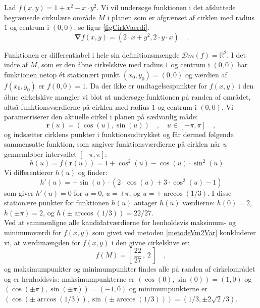 \begin{example}\label{exampUndersog2Var}
Lad $f(x,y) = 1 + x^{2} - x\cdot y^{2}$. Vi vil  undersøge funktionen i det afsluttede begrænsede cirkulære område $M$ i planen som er afgrænset af cirklen med radius $1$ og centrum i $(0, 0)$, se figur \ref{figCirkVaerdi}.
\begin{equation}
\bm{\nabla}f(x, y) = (2\cdot x + y^{2}, 2\cdot y \cdot x) \quad .
\end{equation}

Funktionen er differentiabel i hele sin definitionsmængde $\mathcal{D}m(f) = \mathbb{R}^{2}$. I det indre af $M$, som er den åbne cirkelskive med radius $1$ og centrum i $(0,0)$ har funktionen netop \'{e}t stationært punkt $(x_{0}, y_{0}) = (0, 0)$ og værdien af $f(x_{0}, y_{0})$ er $f(0,0) = 1$. Da der ikke er undtagelsespunkter for $f(x,y)$ i den åbne cirkelskive mangler vi blot at undersøge funktionen på randen af området, altså funktionsværdierne på cirklen med radius $1$ og centrum i $(0,0)$.
Vi parametriserer den aktuelle  cirkel i planen på sædvanlig måde:
\begin{equation}
\mathbf{r}(u) = (\cos(u), \sin(u)) \quad, \quad u \in [-\pi, \pi] \quad ,
\end{equation}
og indsætter cirklens punkter i funktionsudtrykket og får dermed følgende sammensatte funktion, som angiver funktionsværdierne på cirklen når $u$ gennemløber intervallet $[-\pi, \pi]$:
\begin{equation}
h(u) = f(\mathbf{r}(u)) = 1+ \cos^{2}(u) - \cos(u)\cdot\sin^{2}(u) \quad .
\end{equation}
Vi differentierer $h(u)$ og finder:
\begin{equation}
h'(u) = -\sin(u)\cdot(2\cdot \cos(u) + 3\cdot \cos^{2}(u) -1)
\end{equation}
som giver $h'(u) = 0$ for $u= 0$, $u= \pm\pi$, og $u= \pm\arccos(1/3)$. I disse stationære punkter for funktionen
$h(u)$ antager $h(u)$ værdierne: $h(0) = 2$, $h(\pm \pi) = 2$, og $h(\pm\arccos(1/3)) = 22/27$. \\

Ved at sammenligne alle kandidatværdierne for henholdsvis  maksimum- og minimumværdi for $f(x,y)$ som givet ved metoden \ref{metodeVm2Var} konkluderer vi, at værdimængden for $f(x,y)$ i den givne cirkelskive er:
\begin{equation}
f(M) = \left[\, \frac{22}{27}\, , \,  2\, \right] \quad,
\end{equation}
og maksimumpunkter og minimumpunkter findes alle på randen af cirkelområdet og er henholdsvis: maksimumpunkterne er  $(\cos(0), \sin(0)) = (1,0)$ og $(\cos(\pm\pi), \sin(\pm\pi)) = (-1,0)$ og minimumpunkterne er $(\cos(\pm\arccos(1/3)), \sin(\pm\arccos(1/3))) = (1/3, \pm 2\sqrt{2}/3)$.
\end{example}


